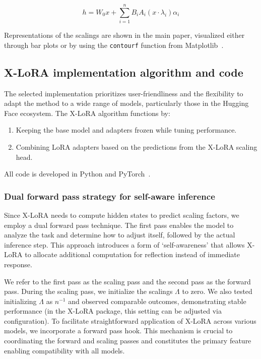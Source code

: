 \begin{equation}
    h = W_0 x + \sum_{i=1}^{n} B_i A_i (x \cdot \lambda_i) \alpha_i
\end{equation}

Representations of the scalings are shown in the main paper, visualized either through bar plots or by using the \texttt{contourf} function from Matplotlib~\cite{MatplotlibDocumentation}.

\subsection{X-LoRA implementation algorithm and code} The selected implementation prioritizes user-friendliness and the flexibility to adapt the method to a wide range of models, particularly those in the Hugging Face ecosystem. The X-LoRA algorithm functions by:

\begin{enumerate}
    \item Keeping the base model and adapters frozen while tuning performance.
    \item Combining LoRA adapters based on the predictions from the X-LoRA scaling head.
\end{enumerate}

All code is developed in Python and PyTorch~\cite{Paszke2019PyTorchLibrary}.

\subsubsection{Dual forward pass strategy for self-aware inference} Since X-LoRA needs to compute hidden states to predict scaling factors, we employ a dual forward pass technique. The first pass enables the model to analyze the task and determine how to adjust itself, followed by the actual inference step. This approach introduces a form of `self-awareness' that allows X-LoRA to allocate additional computation for reflection instead of immediate response.

We refer to the first pass as the scaling pass and the second pass as the forward pass. During the scaling pass, we initialize the scalings $\Lambda$ to zero. We also tested initializing $\Lambda$ as ${n}^{-1}$ and observed comparable outcomes, demonstrating stable performance (in the X-LoRA package, this setting can be adjusted via configuration). To facilitate straightforward application of X-LoRA across various models, we incorporate a forward pass hook. This mechanism is crucial to coordinating the forward and scaling passes and constitutes the primary feature enabling compatibility with all models.

